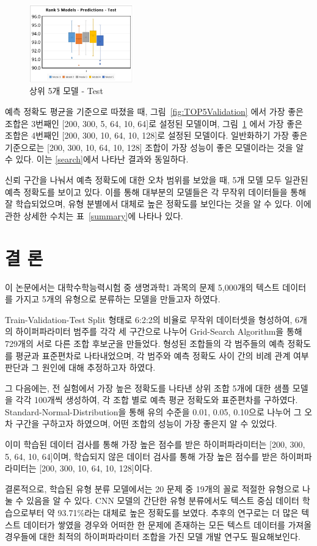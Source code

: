 \documentclass{kcc}
\begin{document}
\begin{figure}[!ht]
\centering
\includegraphics[width=0.4\textwidth]{figs/figure2}
\caption{상위 5개 모델 - Test}
\label{fig:TOP5Test}
\end{figure}

예측 정확도 평균을 기준으로 따졌을 때, 그림~\ref{fig:TOP5Validation} 에서 가장 좋은 조합은 3번째인 [200, 300, 5, 64, 10, 64]로 설정된 모델이며, 그림~\ref{fig:TOP5Test} 에서 가장 좋은 조합은 4번째인 [200, 300, 10, 64, 10, 128]로 설정된 모델이다. 일반화하기 가장 좋은 기준으로는  [200, 300, 10, 64, 10, 128] 조합이 가장 성능이 좋은 모델이라는 것을 알 수 있다. 이는 \ref{search}에서 나타난 결과와 동일하다.

신뢰 구간을 나눠서 예측 정확도에 대한 오차 범위를 보았을 때, 5개 모델 모두 일관된 예측 정확도를 보이고 있다. 이를 통해 대부분의 모델들은 각 무작위 데이터들을 통해 잘 학습되었으며, 유형 분별에서 대체로 높은 정확도를 보인다는 것을 알 수 있다. 이에 관한 상세한 수치는 표~\ref{summary}에 나타나 있다.

\section{결 론}
이 논문에서는 대학수학능력시험 중 생명과학1 과목의 문제 5,000개의 텍스트 데이터를 가지고 5개의 유형으로 분류하는 모델을 만들고자 하였다.

Train-Validation-Test Split 형태로 6:2:2의 비율로 무작위 데이터셋을 형성하여, 6개의 하이퍼파라미터 범주를 각각 세 구간으로 나누어 Grid-Search Algorithm을 통해 729개의 서로 다른 조합 후보군을 만들었다. 형성된 조합들의 각 범주들의 예측 정확도를 평균과 표준편차로 나타내었으며, 각 범주와 예측 정확도 사이 간의 비례 관계 여부 판단과 그 원인에 대해 추정하고자 하였다.

그 다음에는, 전 실험에서 가장 높은 정확도를 나타낸 상위 조합 5개에 대한 샘플 모델을 각각 100개씩 생성하여, 각 조합 별로 예측 평균 정확도와 표준편차를 구하였다. Standard-Normal-Distribution을 통해 유의 수준을 0.01, 0.05, 0.10으로 나누어 그 오차 구간을 구하고자 하였으며, 어떤 조합의 성능이 가장 좋은지 알 수 있었다.

이미 학습된 데이터 검사를 통해 가장 높은 점수를 받은 하이퍼파라미터는 [200, 300, 5, 64, 10, 64]이며, 학습되지 않은 데이터 검사를 통해 가장 높은 점수를 받은 하이퍼파라미터는 [200, 300, 10, 64, 10, 128]이다.

결론적으로, 학습된 유형 분류 모델에서는 20 문제 중 19개의 꼴로 적절한 유형으로 나눌 수 있음을 알 수 있다. CNN 모델의 간단한 유형 분류에서도 텍스트 중심 데이터 학습으로부터 약 93.71\%라는 대체로 높은 정확도를 보였다. 추후의 연구로는 더 많은 텍스트 데이터가 쌓였을 경우와 어떠한 한 문제에 존재하는 모든 텍스트 데이터를 가져올 경우들에 대한 최적의 하이퍼파라미터 조합을 가진 모델 개발 연구도 필요해보인다.



\end{document}
